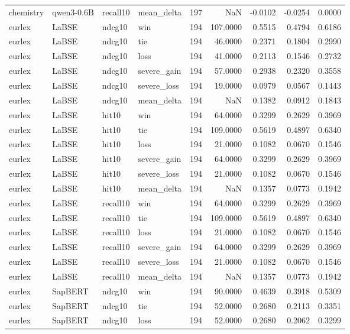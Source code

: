 \begin{tabular}{llllrrrrr}
chemistry & qwen3-0.6B & recall10 & mean\_delta & 197 & NaN & -0.0102 & -0.0254 & 0.0000 \\
eurlex & LaBSE & ndcg10 & win & 194 & 107.0000 & 0.5515 & 0.4794 & 0.6186 \\
eurlex & LaBSE & ndcg10 & tie & 194 & 46.0000 & 0.2371 & 0.1804 & 0.2990 \\
eurlex & LaBSE & ndcg10 & loss & 194 & 41.0000 & 0.2113 & 0.1546 & 0.2732 \\
eurlex & LaBSE & ndcg10 & severe\_gain & 194 & 57.0000 & 0.2938 & 0.2320 & 0.3558 \\
eurlex & LaBSE & ndcg10 & severe\_loss & 194 & 19.0000 & 0.0979 & 0.0567 & 0.1443 \\
eurlex & LaBSE & ndcg10 & mean\_delta & 194 & NaN & 0.1382 & 0.0912 & 0.1843 \\
eurlex & LaBSE & hit10 & win & 194 & 64.0000 & 0.3299 & 0.2629 & 0.3969 \\
eurlex & LaBSE & hit10 & tie & 194 & 109.0000 & 0.5619 & 0.4897 & 0.6340 \\
eurlex & LaBSE & hit10 & loss & 194 & 21.0000 & 0.1082 & 0.0670 & 0.1546 \\
eurlex & LaBSE & hit10 & severe\_gain & 194 & 64.0000 & 0.3299 & 0.2629 & 0.3969 \\
eurlex & LaBSE & hit10 & severe\_loss & 194 & 21.0000 & 0.1082 & 0.0670 & 0.1546 \\
eurlex & LaBSE & hit10 & mean\_delta & 194 & NaN & 0.1357 & 0.0773 & 0.1942 \\
eurlex & LaBSE & recall10 & win & 194 & 64.0000 & 0.3299 & 0.2629 & 0.3969 \\
eurlex & LaBSE & recall10 & tie & 194 & 109.0000 & 0.5619 & 0.4897 & 0.6340 \\
eurlex & LaBSE & recall10 & loss & 194 & 21.0000 & 0.1082 & 0.0670 & 0.1546 \\
eurlex & LaBSE & recall10 & severe\_gain & 194 & 64.0000 & 0.3299 & 0.2629 & 0.3969 \\
eurlex & LaBSE & recall10 & severe\_loss & 194 & 21.0000 & 0.1082 & 0.0670 & 0.1546 \\
eurlex & LaBSE & recall10 & mean\_delta & 194 & NaN & 0.1357 & 0.0773 & 0.1942 \\
eurlex & SapBERT & ndcg10 & win & 194 & 90.0000 & 0.4639 & 0.3918 & 0.5309 \\
eurlex & SapBERT & ndcg10 & tie & 194 & 52.0000 & 0.2680 & 0.2113 & 0.3351 \\
eurlex & SapBERT & ndcg10 & loss & 194 & 52.0000 & 0.2680 & 0.2062 & 0.3299 \\

\end{tabular}
